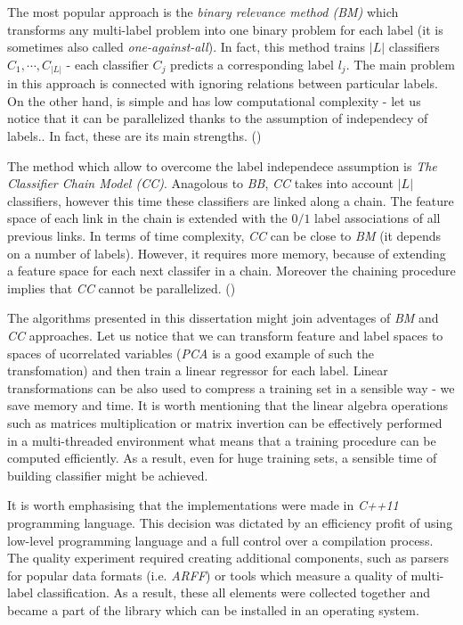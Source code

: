 The most popular approach is the \textit{binary relevance method (BM)} which transforms any multi-label problem into one binary problem for each label (it is sometimes also called \textit{one-against-all}). In fact, this method trains $|L|$ classifiers $C_1, \cdots, C_{|L|}$ - each classifier $C_j$ predicts a corresponding label $l_j$. The main problem in this approach is connected with ignoring relations between particular labels. On the other hand,  is simple and has low computational complexity - let us notice that it can be parallelized thanks to the assumption of independecy of labels.. In fact, these are its main strengths. (\cite{Chain})

The method which allow to overcome the label independece assumption is \textit{The Classifier Chain Model (CC)}. Anagolous to \textit{BB}, \textit{CC} takes into account $|L|$ classifiers, however this time these classifiers are linked along a chain. The feature space of each link in the chain is extended with the $0/1$ label associations of all previous links. In terms of time complexity, \textit{CC} can be close to \textit{BM} (it depends on a number of labels). However, it requires more memory, because of extending a feature space for each next classifer in a chain. Moreover the chaining procedure implies that \textit{CC} cannot be parallelized. (\cite{Chain}) 

The algorithms presented in this dissertation might join adventages of \textit{BM} and \textit{CC} approaches. Let us notice that we can transform feature and label spaces to spaces of ucorrelated variables (\textit{PCA} is a good example of such the transfomation) and then train a linear regressor for each label. Linear transformations can be also used to compress a training set in a sensible way - we save memory and time. It is worth mentioning that the linear algebra operations such as matrices multiplication or matrix invertion can be effectively performed in a multi-threaded environment what means that a training procedure can be computed efficiently. As a result, even for huge training sets, a sensible time of building classifier might be achieved. 

It is worth emphasising that the implementations were made in \textit{C++11} programming language. This decision was dictated by an efficiency profit of using low-level programming language and a full control over a compilation process. The quality experiment required creating additional components, such as parsers for popular data formats (i.e. \textit{ARFF}) or tools which measure a quality of multi-label classification. As a result, these all elements were collected together and became a part of the library which can be installed in an operating system.
